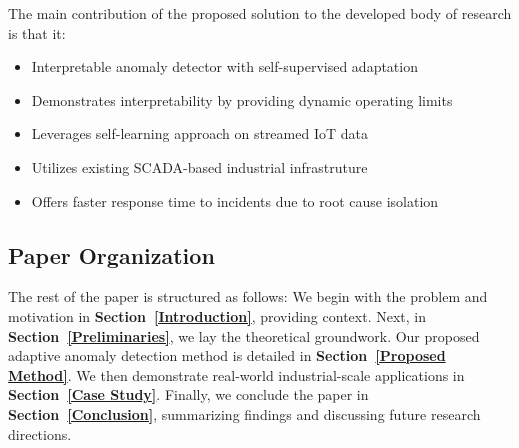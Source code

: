The main contribution of the proposed solution to the developed body of research is that it:
\begin{itemize}
    \item Interpretable anomaly detector with self-supervised adaptation
    \item Demonstrates interpretability by providing dynamic operating limits
    \item Leverages self-learning approach on streamed IoT data
    \item Utilizes existing SCADA-based industrial infrastruture
    \item Offers faster response time to incidents due to root cause isolation
\end{itemize}

\subsection{Paper Organization}
The rest of the paper is structured as follows: We begin with the problem and motivation in \textbf{Section~\ref{Introduction}}, providing context. Next, in \textbf{Section~\ref{Preliminaries}}, we lay the theoretical groundwork. Our proposed adaptive anomaly detection method is detailed in \textbf{Section~\ref{Proposed Method}}. We then demonstrate real-world industrial-scale applications in \textbf{Section~\ref{Case Study}}. Finally, we conclude the paper in \textbf{Section~\ref{Conclusion}}, summarizing findings and discussing future research directions.
